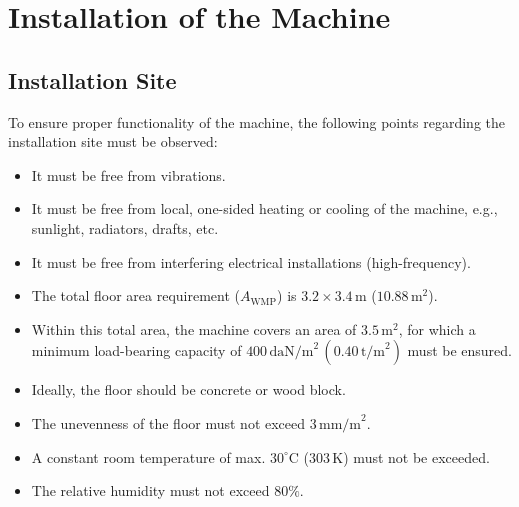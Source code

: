\vspace{1em}


\section{Installation of the Machine}

\subsection{Installation Site}
To ensure proper functionality of the machine, the following points regarding the installation site must be observed:
\begin{itemize}
    \item It must be free from vibrations.
    \item It must be free from local, one-sided heating or cooling of the machine, e.g., sunlight, radiators, drafts, etc.
    \item It must be free from interfering electrical installations (high-frequency).
    \item The total floor area requirement ($A_\text{WMP}$) is $3.2 \times 3.4 \, \text{m}$ ($10.88 \, \text{m}^2$).
    \item Within this total area, the machine covers an area of $3.5 \, \text{m}^2$, for which a minimum load-bearing capacity of $400 \, \text{daN/m}^2 \, (0.40 \, \text{t/m}^2)$ must be ensured.
    \item Ideally, the floor should be concrete or wood block.
\end{itemize}


\begin{itemize}
    \item The unevenness of the floor must not exceed $3 \, \text{mm/m}^2$.
    \item A constant room temperature of max. $30^\circ \text{C}$ ($303 \, \text{K}$) must not be exceeded.
    \item The relative humidity must not exceed $80\%$.
\end{itemize}


